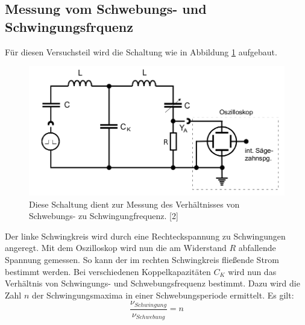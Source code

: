 \documentclass[11pt,ngerman,a4paper]{article}
\begin{document}
\subsection{Messung vom Schwebungs- und Schwingungsfrquenz}
Für diesen Versuchsteil wird die Schaltung wie in Abbildung \ref{abb2} aufgebaut.
\begin{figure}[h!]
\centering
\includegraphics[scale=0.5]{Abb/abb2.png}
\caption{Diese Schaltung dient zur Messung des Verhältnisses von Schwebungs- zu Schwingungfrequenz. [2] }
\label{abb2}
\end{figure}
Der linke Schwingkreis wird durch eine Rechteckspannung zu Schwingungen angeregt. Mit dem Oszilloskop wird nun die am Widerstand $R$ abfallende Spannung gemessen. So kann der im rechten Schwingkreis fließende Strom bestimmt werden. Bei verschiedenen Koppelkapazitäten $C_K$ wird nun das Verhältnis von Schwingungs- und Schwebungsfrequenz bestimmt. Dazu wird die Zahl $n$ der Schwingungsmaxima in einer Schwebungsperiode ermittelt. Es gilt:
\begin{equation}
\frac{\nu_{Schwingung}}{\nu_{Schwebung}} = n
\end{equation}
\end{document}
